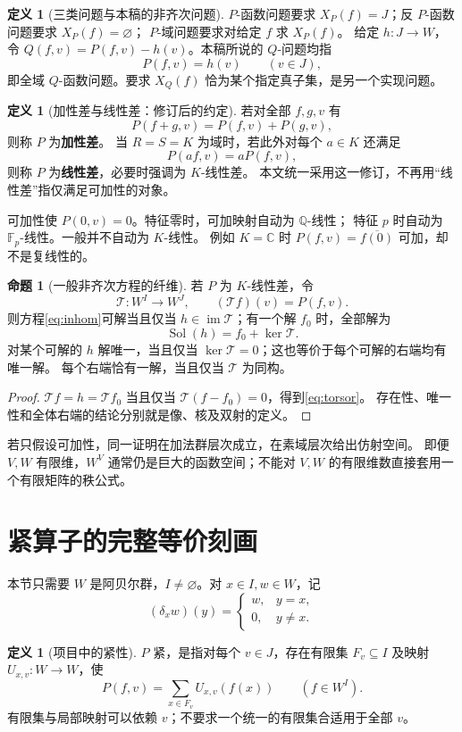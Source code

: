 \documentclass[UTF8,11pt,a4paper]{ctexart}
\theoremstyle{definition}
\newtheorem{proposition}[theorem]{命题}
\newtheorem{definition}[theorem]{定义}
\newcommand{\Q}{\mathbb Q}
\newcommand{\C}{\mathbb C}
\newcommand{\im}{\operatorname{im}}
\newcommand{\T}{\mathcal T}
\newcommand{\Sol}{\operatorname{Sol}}
\begin{document}
\begin{definition}[三类问题与本稿的非齐次问题]
$P$-函数问题要求 $X_P(f)=J$；反 $P$-函数问题要求 $X_P(f)=\varnothing$；
$P$-域问题要求对给定 $f$ 求 $X_P(f)$。
给定 $h:J\to W$，令 $Q(f,v)=P(f,v)-h(v)$。本稿所说的 $Q$-问题均指
\begin{equation}\label{eq:inhom}
 P(f,v)=h(v)\qquad(v\in J),
\end{equation}
即全域 $Q$-函数问题。要求 $X_Q(f)$ 恰为某个指定真子集，是另一个实现问题。
\end{definition}

\begin{definition}[加性差与线性差：修订后的约定]
若对全部 $f,g,v$ 有
\[
 P(f+g,v)=P(f,v)+P(g,v),
\]
则称 $P$ 为\textbf{加性差}。
当 $R=S=K$ 为域时，若此外对每个 $a\in K$ 还满足
\[
 P(af,v)=aP(f,v),
\]
则称 $P$ 为\textbf{线性差}，必要时强调为 $K$-线性差。
本文统一采用这一修订，不再用“线性差”指仅满足可加性的对象。
\end{definition}
可加性使 $P(0,v)=0$。特征零时，可加映射自动为 $\Q$-线性；
特征 $p$ 时自动为 $\mathbb F_p$-线性。一般并不自动为 $K$-线性。
例如 $K=\C$ 时 $P(f,v)=\overline{f(0)}$ 可加，却不是复线性的。

\begin{proposition}[一般非齐次方程的纤维]
若 $P$ 为 $K$-线性差，令
\[
 \T:W^I\to W^J,\qquad (\T f)(v)=P(f,v).
\]
则方程\eqref{eq:inhom}可解当且仅当 $h\in\im\T$；有一个解 $f_0$ 时，全部解为
\begin{equation}\label{eq:torsor}
 \Sol(h)=f_0+\ker\T.
\end{equation}
对某个可解的 $h$ 解唯一，当且仅当 $\ker\T=0$；这也等价于每个可解的右端均有唯一解。
每个右端恰有一解，当且仅当 $\T$ 为同构。
\end{proposition}
\begin{proof}
$\T f=h=\T f_0$ 当且仅当 $\T(f-f_0)=0$，得到\eqref{eq:torsor}。
存在性、唯一性和全体右端的结论分别就是像、核及双射的定义。
\end{proof}
若只假设可加性，同一证明在加法群层次成立，在素域层次给出仿射空间。
即便 $V,W$ 有限维，$W^V$ 通常仍是巨大的函数空间；不能对 $V,W$ 的有限维数直接套用一个有限矩阵的秩公式。

\section{紧算子的完整等价刻画}\label{sec:compact}
本节只需要 $W$ 是阿贝尔群，$I\ne\varnothing$。对 $x\in I,w\in W$，记
\[
 (\delta_xw)(y)=\begin{cases}w,&y=x,\\0,&y\ne x.\end{cases}
\]
\begin{definition}[项目中的紧性]
$P$ 紧，是指对每个 $v\in J$，存在有限集 $F_v\subseteq I$ 及映射 $U_{x,v}:W\to W$，使
\begin{equation}\label{eq:compact}
 P(f,v)=\sum_{x\in F_v}U_{x,v}(f(x))\qquad(f\in W^I).
\end{equation}
有限集与局部映射可以依赖 $v$；不要求一个统一的有限集合适用于全部 $v$。
\end{definition}
\end{document}
